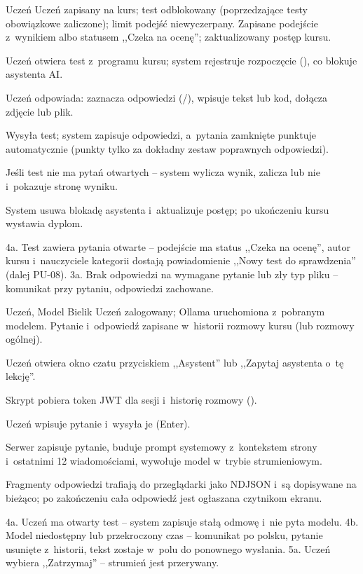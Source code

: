 {Uczeń}
{Uczeń zapisany na kurs; test odblokowany (poprzedzające testy obowiązkowe zaliczone); limit podejść niewyczerpany.}
{Zapisane podejście z~wynikiem albo statusem ,,Czeka na ocenę''; zaktualizowany postęp kursu.}
{\item Uczeń otwiera test z~programu kursu; system rejestruje rozpoczęcie (), co blokuje asystenta AI.
 \item Uczeń odpowiada: zaznacza odpowiedzi (/), wpisuje tekst lub kod, dołącza zdjęcie lub plik.
 \item Wysyła test; system zapisuje odpowiedzi, a~pytania zamknięte punktuje automatycznie (punkty tylko za dokładny zestaw poprawnych odpowiedzi).
 \item Jeśli test nie ma pytań otwartych -- system wylicza wynik, zalicza lub nie i~pokazuje stronę wyniku.
 \item System usuwa blokadę asystenta i~aktualizuje postęp; po ukończeniu kursu wystawia dyplom.}
{4a. Test zawiera pytania otwarte -- podejście ma status ,,Czeka na ocenę'', autor kursu i~nauczyciele kategorii dostają powiadomienie ,,Nowy test do sprawdzenia'' (dalej PU-08).\newline
3a. Brak odpowiedzi na wymagane pytanie lub zły typ pliku -- komunikat przy pytaniu, odpowiedzi zachowane.}

{Uczeń, Model Bielik}
{Uczeń zalogowany; Ollama uruchomiona z~pobranym modelem.}
{Pytanie i~odpowiedź zapisane w~historii rozmowy kursu (lub rozmowy ogólnej).}
{\item Uczeń otwiera okno czatu przyciskiem ,,Asystent'' lub ,,Zapytaj asystenta o~tę lekcję''.
 \item Skrypt pobiera token JWT dla sesji i~historię rozmowy ().
 \item Uczeń wpisuje pytanie i~wysyła je (Enter).
 \item Serwer zapisuje pytanie, buduje prompt systemowy z~kontekstem strony i~ostatnimi 12 wiadomościami, wywołuje model w~trybie strumieniowym.
 \item Fragmenty odpowiedzi trafiają do przeglądarki jako NDJSON i~są dopisywane na bieżąco; po zakończeniu cała odpowiedź jest ogłaszana czytnikom ekranu.}
{4a. Uczeń ma otwarty test -- system zapisuje stałą odmowę i~nie pyta modelu.\newline
4b. Model niedostępny lub przekroczony czas -- komunikat po polsku, pytanie usunięte z~historii, tekst zostaje w~polu do ponownego wysłania.\newline
5a. Uczeń wybiera ,,Zatrzymaj'' -- strumień jest przerywany.}

